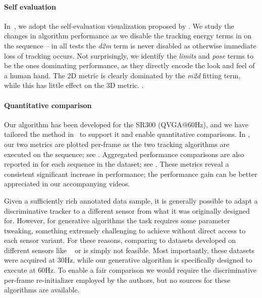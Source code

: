 \paragraph{Self evaluation}
In~, we adopt the self-evaluation visualization proposed by \cite{taylor2016concerto}. We study the changes in algorithm performance as we disable the tracking energy terms in  on the  sequence -- in all tests the \emph{d2m} term is never disabled as otherwise immediate loss of tracking occurs. Not surprisingly, we identify the \emph{limits} and \emph{pose} terms to be the ones dominating performance, as they directly encode the look and feel of a human hand. The 2D metric is clearly dominated by the \emph{m2d} fitting term, while this has little effect on the 3D metric. .


\paragraph{Quantitative comparison}
Our algorithm has been developed for the \realsense{} SR300 (QVGA@60Hz), and we have tailored the method in~\cite{tagliasacchi2015robust} to support it and enable quantitative comparisons. In , our two metrics are plotted per-frame as the two tracking algorithms are executed on the  sequence; see . Aggregated performance comparisons are also reported in  for each sequence in the \handy{} dataset; see . These metrics reveal a consistent significant increase in performance; the performance gain can be better appreciated in our accompanying videos.

Given a sufficiently rich annotated data sample, it is generally possible to adapt a discriminative tracker to a different sensor from what it was originally designed for. However, for generative algorithms the task requires some parameter tweaking, something extremely challenging to achieve without direct access to each sensor variant. For these reasons, comparing to datasets developed on different sensors like \dexter{}~\cite{sridhar2013multicam} or \fingerpaint{} \cite{sharp2015accurate} is simply not feasible. Most importantly, these datasets were acquired at 30Hz, while our generative algorithm is specifically designed to execute at 60Hz. To enable a fair comparison we would require the discriminative per-frame re-initializer employed by the authors, but no sources for these algorithms are available.

